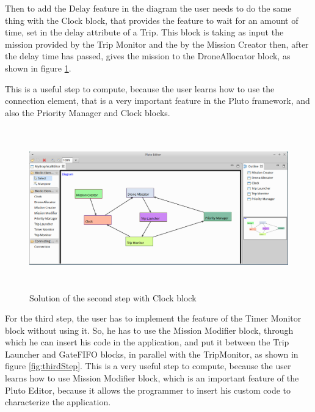 Then to add the Delay feature in the diagram the user needs to do the same thing with the Clock block, that provides the feature to wait for an amount of time, set in the delay attribute of a Trip. This block is taking as input the mission provided by the Trip Monitor and the by the Mission Creator then, after the delay time has passed, gives the mission to the DroneAllocator block, as shown in figure \ref{fig:secondStepClock}.

This is a useful step to compute, because the user learns how to use the connection element, that is a very important feature in the Pluto framework, and also the Priority Manager and Clock blocks.

\begin{figure}[htb]
  \centering
  \includegraphics[width=\linewidth,height=7cm]{pictures/secondStepClock.png}
  \caption{Solution of the second step with Clock block}
  \label{fig:secondStepClock}
\end{figure}

\newpage

For the third step, the user has to implement the feature of the Timer Monitor block without using it.
So, he has to use the Mission Modifier block, through which he can insert his code in the application, and put it between the Trip Launcher and GateFIFO blocks, in parallel with the TripMonitor, as shown in figure \ref{fig:thirdStep}.
This is a very useful step to compute, because the user learns how to use Mission Modifier block, which is an important feature of the Pluto Editor, because it allows the programmer to insert his custom code to characterize the application.

